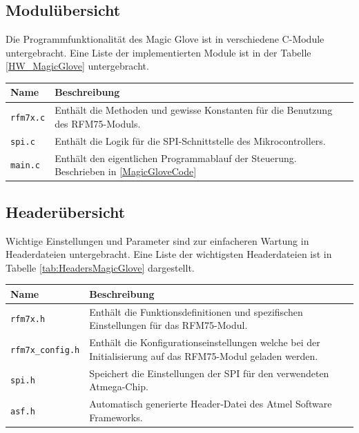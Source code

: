 \subsection*{Modulübersicht}
Die Programmfunktionalität des Magic Glove ist in verschiedene C-Module untergebracht. Eine Liste der implementierten Module ist in der Tabelle \ref{HW_MagicGlove} untergebracht.
\begin{center}
\begin{tabularx}{\textwidth}{l|X}
	Name & Beschreibung \\ \hline
	\texttt{rfm7x.c} & Enthält die Methoden und gewisse Konstanten für die Benutzung des RFM75-Moduls. \\ \hline
	\texttt{spi.c} & Enthält die Logik für die SPI-Schnittstelle des Mikrocontrollers. \\ \hline
	\texttt{main.c} & Enthält den eigentlichen Programmablauf der Steuerung. Beschrieben in \ref{MagicGloveCode} 
	\label{tab:ModulesMagicGlove}
\end{tabularx}
\end{center}
\subsection*{Headerübersicht}
Wichtige Einstellungen und Parameter sind zur einfacheren Wartung in Headerdateien untergebracht. Eine Liste der wichtigsten Headerdateien ist in Tabelle \ref{tab:HeadersMagicGlove} dargestellt.
\begin{center}
\begin{tabularx}{\textwidth}{l|X}
	Name & Beschreibung \\ \hline
	\texttt{rfm7x.h} & Enthält die Funktionsdefinitionen und spezifischen Einstellungen für das RFM75-Modul. \\ \hline
	\texttt{rfm7x{\_}config.h} & Enthält die Konfigurationseinstellungen welche bei der Initialisierung auf das RFM75-Modul geladen werden. \\ \hline
	\texttt{spi.h} & Speichert die Einstellungen der SPI für den verwendeten Atmega-Chip. \\ \hline
	\texttt{asf.h} & Automatisch generierte Header-Datei des Atmel Software Frameworks.
	\label{tab:HeadersMagicGlove}
\end{tabularx}
\end{center}
